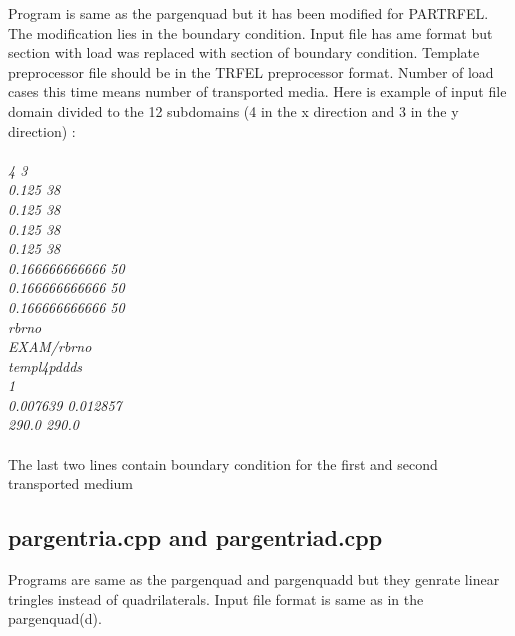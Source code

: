 \documentclass[12pt]{book}
\begin{document}
Program is same as the pargenquad but it has been modified for PARTRFEL. The modification lies in the
boundary condition. Input file has ame format but section with load was replaced with section of
boundary condition. Template preprocessor file should be in the TRFEL preprocessor format. Number of load
cases this time means number of transported media.
Here is example of input file domain divided to the 12 subdomains
(4 in the x direction and 3 in the y direction) :\\
\\
{ \it
4 3\\
0.125 38\\
0.125 38\\
0.125 38\\
0.125 38\\
0.166666666666 50\\
0.166666666666 50\\
0.166666666666 50\\
rbrno\\
EXAM/rbrno\\
templ4pddds\\
1\\
0.007639 0.012857\\
290.0 290.0\\
}
\\
The last two lines contain boundary condition for the first and second transported medium

\subsection {pargentria.cpp and pargentriad.cpp}

Programs are same as the pargenquad and pargenquadd but they genrate linear tringles instead of quadrilaterals.
Input file format is same as in the pargenquad(d).
\end{document}
